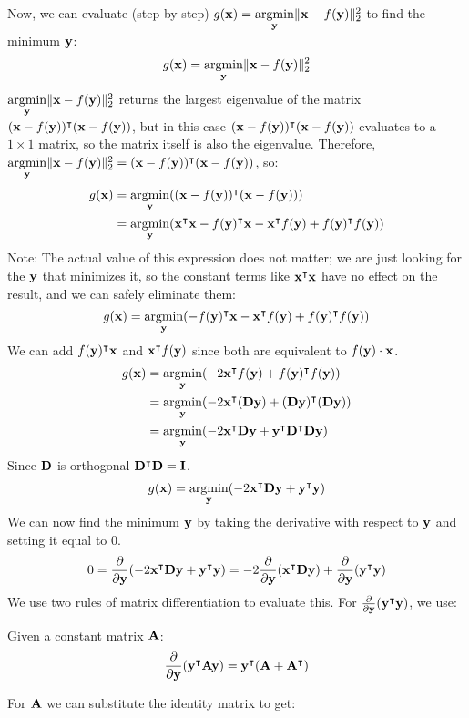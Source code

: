 Now, we can evaluate (step-by-step) $g(\vx) = \underset{\vy}{\argmin} \|\vx - f(\vy)\|^2_2$ to find the minimum $\vy$:
$$g(\vx) = \underset{\vy}{\argmin} \|\vx - f(\vy)\|^2_2$$
$\underset{\vy}{\argmin} \|\vx - f(\vy)\|^2_2$ returns the largest eigenvalue of the matrix $(\vx - f(\vy))^\intercal(\vx - f(\vy))$, but in this case $(\vx - f(\vy))^\intercal(\vx - f(\vy))$ evaluates to a $1 \times 1$ matrix, so the matrix itself is also the eigenvalue.  Therefore, $\underset{\vy}{\argmin} \|\vx - f(\vy)\|^2_2 = (\vx - f(\vy))^\intercal(\vx - f(\vy))$, so:
\begin{align*}
    g(\vx) &= \underset{\vy}{\argmin} ((\vx - f(\vy))^\intercal(\vx - f(\vy))) \\
&= \underset{\vy}{\argmin} (\vx^\intercal\vx - f(\vy)^\intercal\vx - \vx^\intercal f(\vy) + f(\vy)^\intercal f(\vy))
\end{align*}
Note: The actual value of this expression does not matter; we are just looking for the $\vy$ that minimizes it, so the constant terms like $\vx^\intercal\vx$ have no effect on the result, and we can safely eliminate them:
$$g(\vx) = \underset{\vy}{\argmin} (-f(\vy)^\intercal\vx - \vx^\intercal f(\vy) + f(\vy)^\intercal f(\vy))$$
We can add $f(\vy)^\intercal\vx$ and $\vx^\intercal f(\vy)$ since both are equivalent to $f(\vy) \cdot \vx$.
\begin{align*}
g(\vx) &= \underset{\vy}{\argmin} (-2\vx^\intercal f(\vy) + f(\vy)^\intercal f(\vy))\\
&= \underset{\vy}{\argmin} (-2\vx^\intercal(\MD\vy) + (\MD\vy)^\intercal(\MD\vy))\\
&= \underset{\vy}{\argmin} (-2\vx^\intercal\MD\vy + \vy^\intercal\MD^\intercal\MD\vy)
\end{align*}
Since $\MD$ is orthogonal $\MD^\intercal\MD = \MI$.
$$g(\vx) = \underset{\vy}{\argmin} (-2\vx^\intercal\MD\vy + \vy^\intercal\vy)$$
We can now find the minimum $\vy$ by taking the derivative with respect to $\vy$ and setting it equal to 0.
$$0 = \frac{\partial}{\partial\vy}(-2\vx^\intercal\MD\vy + \vy^\intercal\vy) = -2\frac{\partial}{\partial\vy}(\vx^\intercal\MD\vy) + \frac{\partial}{\partial\vy}(\vy^\intercal\vy)$$
We use two rules of matrix differentiation to evaluate this.  For $\frac{\partial}{\partial\vy}(\vy^\intercal\vy)$, we use:
\begin{theorem}
    Given a constant matrix $\MA$:
    $$\frac{\partial}{\partial\vy}(\vy^\intercal\MA\vy) = \vy^\intercal(\MA + \MA^\intercal)$$
\end{theorem}
For $\MA$ we can substitute the identity matrix to get:
